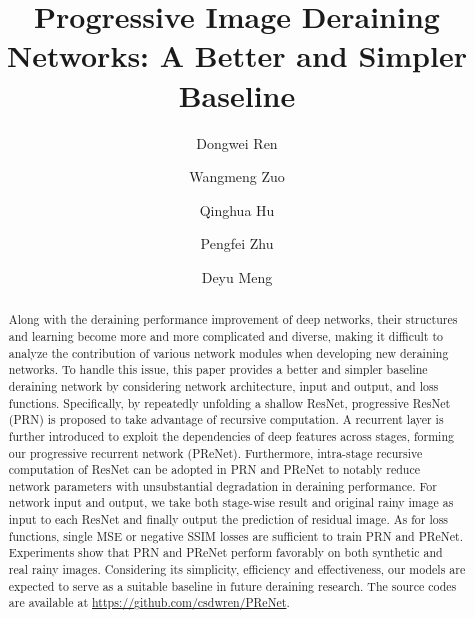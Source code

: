 \documentclass[10pt,twocolumn,letterpaper]{article}
\begin{document}
\title{Progressive Image Deraining Networks: A Better and Simpler Baseline}

\author[1]{Dongwei Ren}
\author[2]{Wangmeng Zuo}
\author[1]{Qinghua Hu}
\author[1]{Pengfei Zhu}
\author[3]{Deyu Meng}


\maketitle


\begin{abstract}
Along with the deraining performance improvement of deep networks, their structures and learning become more and more complicated and diverse, making it difficult to analyze the contribution of various network modules when developing new deraining networks.
To handle this issue, this paper provides a better and simpler baseline deraining network by considering network architecture, input and output, and loss functions.
Specifically, by repeatedly unfolding a shallow ResNet, progressive ResNet (PRN) is proposed to take advantage of recursive computation.
A recurrent layer is further introduced to exploit the dependencies of deep features across stages, forming our progressive recurrent network (PReNet).
Furthermore, intra-stage recursive computation of ResNet can be adopted in PRN and PReNet to notably reduce network parameters with unsubstantial degradation in deraining performance.
For network input and output, we take both stage-wise result and original rainy image as input to each ResNet and finally output the prediction of {residual image}.
As for loss functions, single MSE or negative SSIM losses are sufficient to train PRN and PReNet.
Experiments show that PRN and PReNet perform favorably on both synthetic and real rainy images.
Considering its simplicity, efficiency and effectiveness, our models are expected to serve as a suitable baseline in future deraining research.
The source codes are available at \url{https://github.com/csdwren/PReNet}.
\end{abstract}
\end{document}
